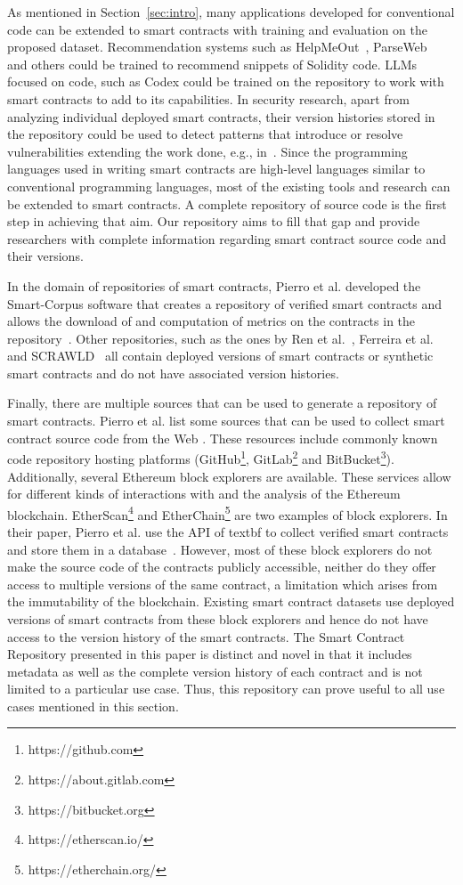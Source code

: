 \documentclass[10pt,conference]{IEEEtran}
\begin{document}
	As mentioned in Section~\ref{sec:intro}, many applications developed for conventional code can be extended to smart contracts with training and evaluation on the proposed dataset.  Recommendation systems such as HelpMeOut~\cite{helpmeout}, ParseWeb~\cite{parseweb} and others could be trained to recommend snippets of Solidity code. LLMs focused on code, such as Codex \cite{codex} could be trained on the repository to work with smart contracts to add to its capabilities. In security research, apart from analyzing individual deployed smart contracts, their version histories stored in the repository could be used to detect patterns that introduce or resolve vulnerabilities extending the work done, e.g., in~\cite{securitydataset}. Since the programming languages used in writing smart contracts are high-level languages similar to conventional programming languages, most of the existing tools and research can be extended to smart contracts. A complete repository of source code is the first step in achieving that aim. Our repository aims to fill that gap and provide researchers with complete information regarding smart contract source code and their versions. 
	
	In the domain of repositories of smart contracts, Pierro et al. developed the Smart-Corpus software that creates a repository of verified smart contracts and allows the download of and computation of metrics on the contracts in the repository~\cite{pierro}. Other repositories, such as the ones by Ren et al.~\cite{renrepo}, Ferreira et al.~\cite{ferreirarepo} and SCRAWLD~\cite{scrawld} all contain deployed versions of smart contracts or synthetic smart contracts and do not have associated version histories. 
	
	Finally, there are multiple sources that can be used to generate a repository of smart contracts.  Pierro et al. list some sources that can be used to collect smart contract source code from the Web \cite{pierro}. These resources include commonly known code repository hosting platforms (GitHub\footnote{https://github.com}, GitLab\footnote{https://about.gitlab.com} and BitBucket\footnote{https://bitbucket.org}). Additionally, several Ethereum block explorers are available. These services allow for different kinds of interactions with and the analysis of the Ethereum blockchain. EtherScan\footnote{https://etherscan.io/} and EtherChain\footnote{https://etherchain.org/} are two examples of block explorers. In their paper, Pierro et al. use the API of textbf to collect verified smart contracts and store them in a database~\cite{pierro}. However, most of these block explorers do not make the source code of the contracts publicly accessible, neither do they offer access to multiple versions of the same contract, a limitation which arises from the immutability of the blockchain. Existing smart contract datasets use deployed versions of smart contracts from these block explorers and hence do not have access to the version history of the smart contracts. The Smart Contract Repository presented in this paper is distinct and novel in that it includes metadata as well as the complete version history of each contract and is not limited to a particular use case. Thus, this repository can prove useful to all use cases mentioned in this section. 
	
\end{document}
